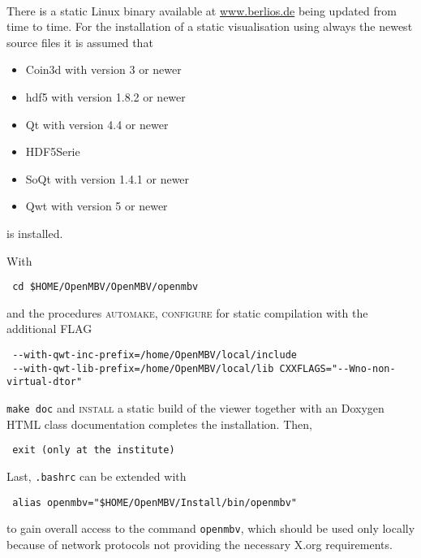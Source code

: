 \paragraph{\OpenMBV{}}
There is a static Linux binary available at \url{www.berlios.de} being updated from time to time. For the installation of a static visualisation using always the newest source files it is assumed that
\begin{itemize}
\item Coin3d with version 3 or newer 
\item hdf5 with version 1.8.2 or newer 
\item Qt with version 4.4 or newer 
\item HDF5Serie 
\item SoQt with version 1.4.1 or newer 
\item Qwt with version 5 or newer 
\end{itemize}
is installed.\par
With
\begin{verbatim}
 cd $HOME/OpenMBV/OpenMBV/openmbv
\end{verbatim} 
and the procedures \textsc{automake, configure} for static compilation with the additional FLAG
\begin{verbatim}
 --with-qwt-inc-prefix=/home/OpenMBV/local/include 
 --with-qwt-lib-prefix=/home/OpenMBV/local/lib CXXFLAGS="--Wno-non-virtual-dtor" 
\end{verbatim}
\texttt{make doc} and \textsc{install} a static build of the viewer together with an Doxygen HTML class documentation completes the installation. Then,
\begin{verbatim}
 exit (only at the institute)
\end{verbatim}
Last, \texttt{.bashrc} can be extended with
\begin{verbatim}
 alias openmbv="$HOME/OpenMBV/Install/bin/openmbv"
\end{verbatim}
to gain overall access to the command \texttt{openmbv}, which should be used only locally because of network protocols not providing the necessary X.org requirements.

